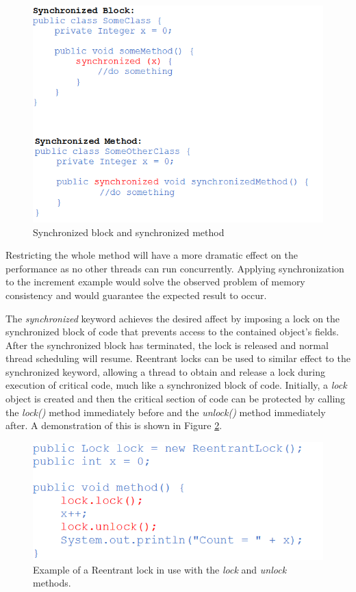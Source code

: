 \documentclass[a4paper,12pt]{article}
\begin{document}
\begin{figure}[h]
    \centering
    \includegraphics[scale = 0.8]{synchronized.png}
    \caption{Synchronized block and synchronized method}
    \label{fig:synchronized}
\end{figure}

Restricting the whole method will have a more dramatic effect on the performance as no other threads can run concurrently. Applying synchronization to the increment example would solve the observed problem of memory consistency and would guarantee the expected result to occur.

The \textit{synchronized} keyword achieves the desired affect by imposing a lock on the synchronized block of code that prevents access to the contained object’s fields. After the synchronized block has terminated, the lock is released and normal thread scheduling will resume. Reentrant locks can be used to similar effect to the synchronized keyword, allowing a thread to obtain and release a lock during execution of critical code, much like a synchronized block of code. Initially, a \textit{lock} object is created and then the critical section of code can be protected by calling the \textit{lock()} method immediately before and the \textit{unlock()} method immediately after. A demonstration of this is shown in Figure \ref{fig:lock}.

\begin{figure}
    \centering
    \includegraphics[scale = 0.6]{lock.png}
    \caption{Example of a Reentrant lock in use with the \textit{lock} and \textit{unlock} methods.}
    \label{fig:lock}
\end{figure}
 
\end{document}
